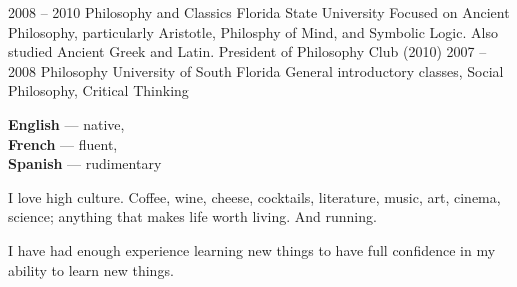 \documentclass[9pt]{developercv} %
\begin{document}


\begin{entrylist}
    \entry
        {2008 -- 2010}
        {Philosophy and Classics}
        {Florida State University}
        {Focused on Ancient Philosophy, particularly Aristotle, Philosphy of
        Mind, and Symbolic Logic. Also studied Ancient Greek and Latin.
        President of Philosophy Club (2010)}
    \entry
        {2007 -- 2008}
        {Philosophy}
        {University of South Florida}
        {General introductory classes, Social Philosophy, Critical Thinking}
\end{entrylist}


\begin{minipage}[t]{0.2\textwidth}
    \vspace{-\baselineskip} %


        \textbf{English} — native,\\
        \textbf{French} — fluent,\\
        \textbf{Spanish} — rudimentary

\end{minipage}
\hfill
\begin{minipage}[t]{0.3\textwidth}
    \vspace{-\baselineskip} %


    I love high culture. Coffee, wine, cheese, cocktails, literature, music,
    art, cinema, science; anything that makes life worth living. And running.
\end{minipage}
\hfill
\begin{minipage}[t]{0.35\textwidth}
    \vspace{-\baselineskip} %


    I have had enough experience learning new things to have full confidence in
    my ability to learn new things.
\end{minipage}

\end{document}
